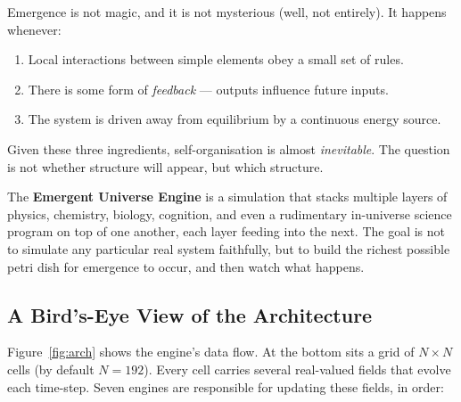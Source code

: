 \documentclass[12pt,a4paper]{article}
\begin{document}
\begin{tcolorbox}[intubox={The key intuition about emergence}]
Emergence is not magic, and it is not mysterious (well, not entirely).
It happens whenever:
\begin{enumerate}[nosep]
  \item Local interactions between simple elements obey a small set of rules.
  \item There is some form of \emph{feedback} — outputs influence future inputs.
  \item The system is driven away from equilibrium by a continuous energy source.
\end{enumerate}
Given these three ingredients, self-organisation is almost
\emph{inevitable}.  The question is not whether structure will appear,
but which structure.
\end{tcolorbox}

The \textbf{Emergent Universe Engine} is a simulation that stacks
multiple layers of physics, chemistry, biology, cognition,
and even a rudimentary in-universe science program on top of one
another, each layer feeding into the next.
The goal is not to simulate any particular real system faithfully,
but to build the richest possible petri dish for emergence to occur,
and then watch what happens.

\subsection{A Bird's-Eye View of the Architecture}

Figure~\ref{fig:arch} shows the engine's data flow.
At the bottom sits a grid of $N \times N$ cells (by default $N=192$).
Every cell carries several real-valued fields that evolve each time-step.
Seven engines are responsible for updating these fields,
in order:
\end{document}
